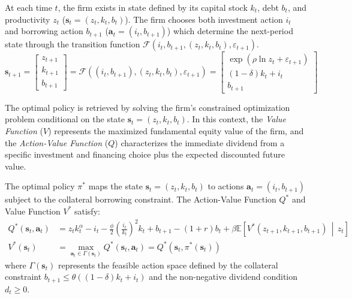 At each time $t$, the firm exists in state defined by its capital stock $k_t$, debt $b_t$, 
and productivity $z_t$ ($\mathbf{s}_t = (z_t, k_t, b_t)$). The firm chooses both investment
action $i_t$ and borrowing action $b_{t+1}$ ($\mathbf{a}_t = (i_t, b_{t+1})$) which 
determine the next-period state through the transition function $\mathcal{F}(i_t, b_{t+1}, (z_t, k_t, b_t), \varepsilon_{t+1})$.
\begin{equation}
\mathbf{s}_{t+1} = 
\begin{bmatrix}
        z_{t+1} \\
        k_{t+1} \\
        b_{t+1}
\end{bmatrix} = \mathcal{F}\left((i_t, b_{t+1}), (z_t, k_t, b_t), \varepsilon_{t+1}\right) =
\begin{bmatrix}
\exp\left(\rho \ln z_t + \varepsilon_{t+1}\right) \\
(1-\delta)k_t + i_t \\
b_{t+1}
\end{bmatrix}
\end{equation}

The optimal policy is retrieved by solving the firm's constrained optimization problem 
conditional on the state $\mathbf{s}_t = (z_t, k_t, b_t)$. In this context, 
the \textit{Value Function} ($V$) represents the maximized fundamental equity value of 
the firm, and the \textit{Action-Value Function} ($Q$) characterizes the immediate 
dividend from a specific investment and financing choice plus the expected discounted 
future value.

\begin{proposition}
    The optimal policy $\pi^*$ maps the state $\mathbf{s}_t = (z_t, k_t, b_t)$ to actions $\mathbf{a}_t = (i_t, b_{t+1})$ subject to the collateral borrowing constraint. The Action-Value Function $Q^*$ and Value Function $V^*$ satisfy:
\begin{align}
        Q^*(\mathbf{s}_t, \mathbf{a}_t) &= z_t k_t^\alpha - i_t - \frac{\phi}{2} \left(\frac{i_t}{k_t}\right)^2 k_t + b_{t+1} - (1+r)b_t + \beta \mathbb{E} \left[ V^*(z_{t+1}, k_{t+1}, b_{t+1}) \,\middle|\, z_t \right] \\
        V^*(\mathbf{s}_t) &= \max_{\mathbf{a}_t \in \Gamma(\mathbf{s}_t)} Q^*(\mathbf{s}_t, \mathbf{a}_t) = Q^*(\mathbf{s}_t, \pi^*(\mathbf{s}_t))
\end{align}
where $\Gamma(\mathbf{s}_t)$ represents the feasible action space defined by the collateral constraint $b_{t+1} \leq \theta ((1-\delta)k_t + i_t)$ and the non-negative dividend condition $d_t \geq 0$.
\end{proposition}

